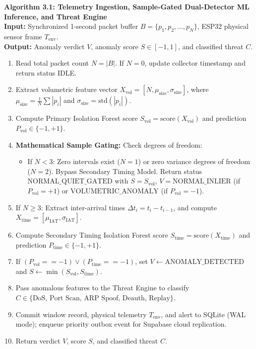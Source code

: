 \documentclass[11pt,a4paper]{report}
\begin{document}
\vspace{4pt}
\noindent
\textbf{Algorithm 3.1: Telemetry Ingestion, Sample-Gated Dual-Detector ML Inference, and Threat Engine} \\
\textbf{Input:} Synchronized 1-second packet buffer $B = \{p_1, p_2, \dots, p_N\}$, ESP32 physical sensor frame $T_{\text{env}}$. \\
\textbf{Output:} Anomaly verdict $V$, anomaly score $S \in [-1, 1]$, and classified threat $C$.
\begin{enumerate}[leftmargin=*,itemsep=1pt,parsep=0pt,topsep=2pt]
    \item Read total packet count $N = |B|$. If $N = 0$, update collector timestamp and return status IDLE.
    \item Extract volumetric feature vector $X_{\text{vol}} = [N, \mu_{\text{size}}, \sigma_{\text{size}}]$, where $\mu_{\text{size}} = \frac{1}{N}\sum |p_i|$ and $\sigma_{\text{size}} = \text{std}(|p_i|)$.
    \item Compute Primary Isolation Forest score $S_{\text{vol}} = \text{score}(X_{\text{vol}})$ and prediction $P_{\text{vol}} \in \{-1, +1\}$.
    \item \textbf{Mathematical Sample Gating:} Check degrees of freedom:
    \begin{itemize}[leftmargin=1.5em,itemsep=0pt]
        \item If $N < 3$: Zero intervals exist ($N=1$) or zero variance degrees of freedom ($N=2$). Bypass Secondary Timing Model. Return status $\text{NORMAL\_QUIET\_GATED}$ with $S = S_{\text{vol}}$, $V = \text{NORMAL\_INLIER}$ (if $P_{\text{vol}} = +1$) or $\text{VOLUMETRIC\_ANOMALY}$ (if $P_{\text{vol}} = -1$).
    \end{itemize}
    \item If $N \ge 3$: Extract inter-arrival times $\Delta t_i = t_{i} - t_{i-1}$, and compute $X_{\text{time}} = [\mu_{\text{IAT}}, \sigma_{\text{IAT}}]$.
    \item Compute Secondary Timing Isolation Forest score $S_{\text{time}} = \text{score}(X_{\text{time}})$ and prediction $P_{\text{time}} \in \{-1, +1\}$.
    \item If $(P_{\text{vol}} == -1) \lor (P_{\text{time}} == -1)$, set $V \leftarrow \text{ANOMALY\_DETECTED}$ and $S \leftarrow \min(S_{\text{vol}}, S_{\text{time}})$.
    \item Pass anomalous features to the Threat Engine to classify $C \in \{\text{DoS, Port Scan, ARP Spoof, Deauth, Replay}\}$.
    \item Commit window record, physical telemetry $T_{\text{env}}$, and alert to SQLite (WAL mode); enqueue priority outbox event for Supabase cloud replication.
    \item Return verdict $V$, score $S$, and classified threat $C$.
\end{enumerate}
\end{document}
